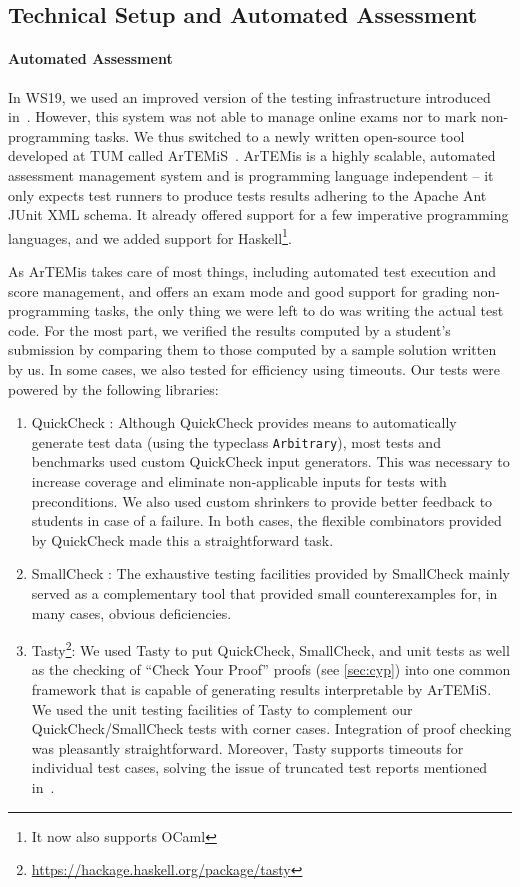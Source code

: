 \subsection{Technical Setup and Automated Assessment}\label{sec:tech_setup_test}

\paragraph{Automated Assessment}
In WS19, we used an improved version of
the testing infrastructure introduced in~\cite{next_1100}.
However, this system was not able to manage online exams nor to mark non-programming tasks.
We thus switched to a newly written open-source
tool developed at TUM called ArTEMiS~\cite{artemis}.
ArTEMis is a highly scalable, automated assessment management system and is programming language independent --
it only expects test runners to produce tests results
adhering to the Apache Ant JUnit XML schema.
It already offered support for a few imperative programming languages,
and we added support for Haskell\footnote{It now also supports OCaml}.

As ArTEMis takes care of most things,
including automated test execution and score management,
and offers an exam mode and good support for grading non-programming tasks,
the only thing we were left to do was writing the actual test code.
For the most part, we verified the results computed
by a student's submission by comparing them to those
computed by a sample solution written by us.
In some cases, we also tested for efficiency using timeouts.
Our tests were powered by the following libraries:
\begin{enumerate}
  \item QuickCheck \cite{quickcheck}:
  Although QuickCheck provides means to automatically generate test data (using the typeclass \lstinline!Arbitrary!),
  most tests and benchmarks used custom QuickCheck input generators.
  This was necessary to increase coverage and eliminate non-applicable inputs for tests with preconditions.
  We also used custom shrinkers to provide better feedback to students in case of a failure.
  In both cases, the flexible combinators provided by QuickCheck made this a straightforward task.
  \item SmallCheck \cite{smallcheck}: The exhaustive testing facilities provided by SmallCheck mainly served
    as a complementary tool that provided small counterexamples for, in many cases, obvious deficiencies.
  \item Tasty\footnote{\url{https://hackage.haskell.org/package/tasty}}: We used Tasty to put QuickCheck, SmallCheck, and unit tests as well as the checking of ``Check Your Proof'' proofs (see \cref{sec:cyp}) into one common framework that is capable of generating results interpretable by ArTEMiS.
  We used the unit testing facilities of Tasty to complement our QuickCheck/SmallCheck tests with corner cases.
  Integration of proof checking was pleasantly straightforward.
  Moreover, Tasty supports timeouts for individual test cases,
  solving the issue of truncated test reports mentioned in~\cite{next_1100}.
\end{enumerate}

